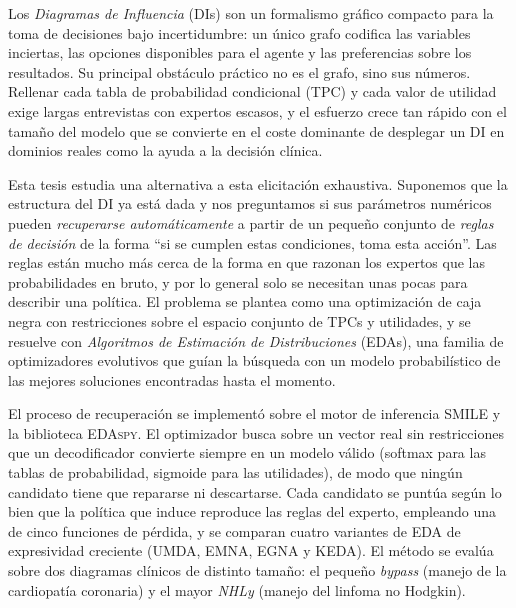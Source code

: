 Los \emph{Diagramas de Influencia} (DIs) son un formalismo gráfico compacto para
la toma de decisiones bajo incertidumbre: un único grafo codifica las variables
inciertas, las opciones disponibles para el agente y las preferencias sobre los
resultados. Su principal obstáculo práctico no es el grafo, sino sus números.
Rellenar cada tabla de probabilidad condicional (TPC) y cada valor de utilidad
exige largas entrevistas con expertos escasos, y el esfuerzo crece tan rápido
con el tamaño del modelo que se convierte en el coste dominante de desplegar un
DI en dominios reales como la ayuda a la decisión clínica.

Esta tesis estudia una alternativa a esta elicitación exhaustiva. Suponemos que
la estructura del DI ya está dada y nos preguntamos si sus parámetros numéricos
pueden \emph{recuperarse automáticamente} a partir de un pequeño conjunto de
\emph{reglas de decisión} de la forma ``si se cumplen estas condiciones, toma
esta acción''. Las reglas están mucho más cerca de la forma en que razonan los
expertos que las probabilidades en bruto, y por lo general solo se necesitan unas
pocas para describir una política. El problema se plantea como una optimización
de caja negra con restricciones sobre el espacio conjunto de TPCs y utilidades,
y se resuelve con \emph{Algoritmos de Estimación de Distribuciones} (EDAs), una
familia de optimizadores evolutivos que guían la búsqueda con un modelo
probabilístico de las mejores soluciones encontradas hasta el momento.

El proceso de recuperación se implementó sobre el motor de inferencia
\textsc{SMILE} y la biblioteca \textsc{EDAspy}. El optimizador busca sobre un
vector real sin restricciones que un decodificador convierte siempre en un
modelo válido (softmax para las tablas de probabilidad, sigmoide para las
utilidades), de modo que ningún candidato tiene que repararse ni descartarse.
Cada candidato se puntúa según lo bien que la política que induce reproduce las
reglas del experto, empleando una de cinco funciones de pérdida, y se comparan
cuatro variantes de EDA de expresividad creciente (UMDA, EMNA, EGNA y KEDA). El
método se evalúa sobre dos diagramas clínicos de distinto tamaño: el pequeño
\emph{bypass} (manejo de la cardiopatía coronaria) y el mayor \emph{NHLy}
(manejo del linfoma no Hodgkin).

